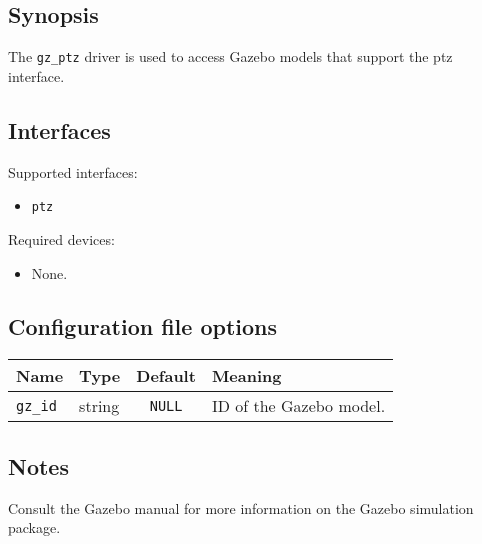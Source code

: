 \subsection*{Synopsis}

The {\tt gz\_ptz} driver is used to access Gazebo models that
support the ptz interface.

\subsection*{Interfaces}

\noindent Supported interfaces:
\begin{itemize}
\item {\tt ptz}
\end{itemize}

\noindent Required devices:
\begin{itemize}
\item None.
\end{itemize}



\subsection*{Configuration file options}

\begin{center}
{\small \begin{tabularx}{\columnwidth}{|l|l|c|X|}
\hline
Name & Type & Default & Meaning\\
\hline
{\tt gz\_id} & string & {\tt NULL} & ID of the Gazebo model. \\
\hline
\end{tabularx}}
\end{center}

\subsection*{Notes}

Consult the Gazebo manual for more information on the Gazebo
simulation package.

